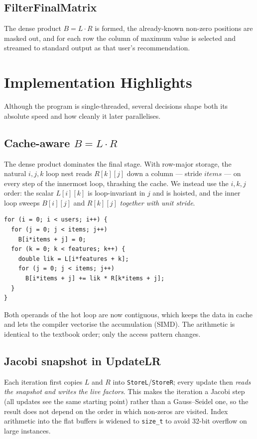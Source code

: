 \documentclass[twocolumn]{article}
\begin{document}
    \subsection{FilterFinalMatrix}\label{subsec:filterfinalmatrix}
    The dense product $B = L \cdot R$ is formed, the already-known non-zero positions are
    masked out, and for each row the column of maximum value is selected and streamed to
    standard output as that user's recommendation.


    \section{Implementation Highlights}\label{sec:highlights}
    Although the program is single-threaded, several decisions shape both its absolute
    speed and how cleanly it later parallelises.

    \subsection{Cache-aware $B = L \cdot R$}\label{subsec:cache}
    The dense product dominates the final stage. With row-major storage, the natural
    $i,j,k$ loop nest reads $R[k][j]$ down a column --- stride $\textit{items}$ --- on
    every step of the innermost loop, thrashing the cache. We instead use the $i,k,j$
    order: the scalar $L[i][k]$ is loop-invariant in $j$ and is hoisted, and the inner
    loop sweeps $B[i][j]$ and $R[k][j]$ \emph{together with unit stride}.

    \begin{lstlisting}
for (i = 0; i < users; i++) {
  for (j = 0; j < items; j++)
    B[i*items + j] = 0;
  for (k = 0; k < features; k++) {
    double lik = L[i*features + k];
    for (j = 0; j < items; j++)
      B[i*items + j] += lik * R[k*items + j];
  }
}
    \end{lstlisting}

    Both operands of the hot loop are now contiguous, which keeps the data in cache and
    lets the compiler vectorise the accumulation (SIMD). The arithmetic is identical to
    the textbook order; only the access pattern changes.

    \subsection{Jacobi snapshot in UpdateLR}\label{subsec:snapshot}
    Each iteration first copies $L$ and $R$ into \texttt{StoreL}/\texttt{StoreR}; every
    update then \emph{reads the snapshot and writes the live factors}. This makes the
    iteration a Jacobi step (all updates see the same starting point) rather than a
    Gauss--Seidel one, so the result does not depend on the order in which non-zeros are
    visited. Index arithmetic into the flat buffers is widened to \texttt{size\_t} to
    avoid 32-bit overflow on large instances.
\end{document}
